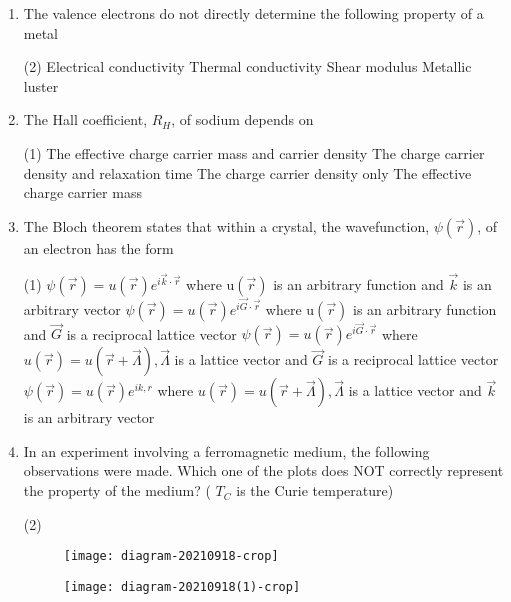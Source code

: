 \begin{enumerate}
	\item The valence electrons do not directly determine the following property of a metal
{	}
\begin{tasks}(2)
\task[\textbf{A.}] Electrical conductivity
\task[\textbf{B.}]  Thermal conductivity
\task[\textbf{C.}] Shear modulus
\task[\textbf{D.}] Metallic luster
\end{tasks}
	\item The Hall coefficient, $R_{H}$, of sodium depends on
{	}
\begin{tasks}(1)
\task[\textbf{A.}]  The effective charge carrier mass and carrier density
\task[\textbf{B.}] The charge carrier density and relaxation time
\task[\textbf{C.}]  The charge carrier density only
\task[\textbf{D.}] The effective charge carrier mass
\end{tasks}
	\item  The Bloch theorem states that within a crystal, the wavefunction, $\psi(\vec{r})$, of an electron has the form
{	}
\begin{tasks}(1)
\task[\textbf{A.}]  $\psi(\vec{r})=u(\vec{r}) e^{i \vec{k} \cdot \vec{r}}$ where $\mathrm{u}(\vec{r})$ is an arbitrary function and $\vec{k}$ is an arbitrary vector
\task[\textbf{B.}]  $\psi(\vec{r})=u(\vec{r}) e^{i \vec{G} \cdot \vec{r}}$ where $\mathrm{u}(\vec{r})$ is an arbitrary function and $\vec{G}$ is a reciprocal lattice vector
\task[\textbf{C.}]  $\psi(\vec{r})=u(\vec{r}) e^{i \vec{G} \cdot \vec{r}}$ where $u(\vec{r})=u(\vec{r}+\vec{\Lambda}), \vec{\Lambda}$ is a lattice vector and $\vec{G}$ is a reciprocal lattice vector
\task[\textbf{D.}]  $\psi(\vec{r})=u(\vec{r}) e^{i k, r}$ where $u(\vec{r})=u(\vec{r}+\vec{\Lambda}), \vec{\Lambda}$ is a lattice vector and $\vec{k}$ is an arbitrary vector
\end{tasks}
	\item In an experiment involving a ferromagnetic medium, the following observations were made. Which one of the plots does NOT correctly represent the property of the medium? ( $T_{C}$ is the Curie temperature)
{	}
\begin{tasks}(2)
\task[\textbf{A.}] \begin{figure}[H]
	\centering
	\texttt{[image: diagram-20210918-crop]}
\end{figure}
\task[\textbf{B.}] \begin{figure}[H]
	\centering
	\texttt{[image: diagram-20210918(1)-crop]}

\end{figure}
\end{tasks}
\end{enumerate}
